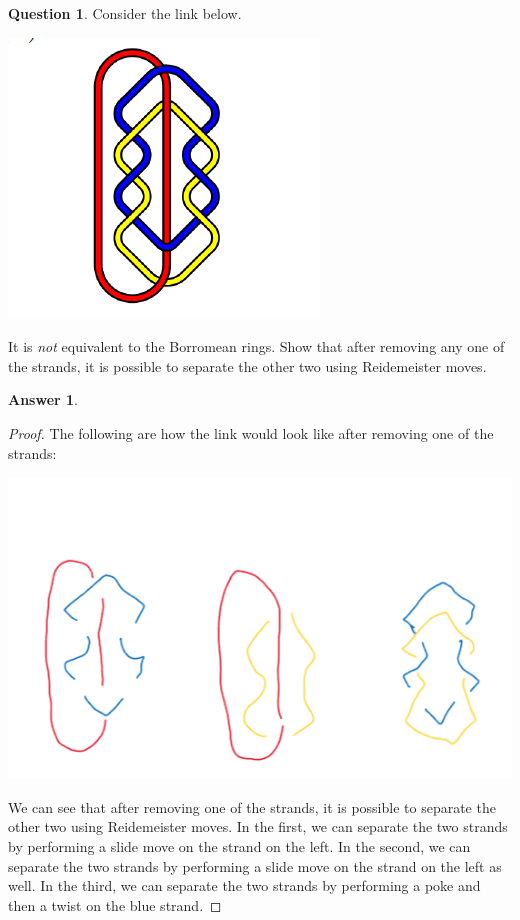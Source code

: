 \documentclass[article, 12pt]{article}
\theoremstyle{definition}
\newtheorem{question}{Question}
\newtheorem{answer}{Answer}
\begin{document}
    \begin{question}
        Consider the link below. 

        \includegraphics[scale=.4]{fullpaper.png}
        
        It is \textit{not} equivalent to the Borromean rings. Show that after removing any one of the strands, it is possible to separate the other two using Reidemeister moves.
    \end{question}

    \begin{answer}
        \begin{proof}
            The following are how the link would look like after removing one of the strands:
            
            \includegraphics[scale=.4]{paperclip_and_shit.png}

            We can see that after removing one of the strands, it is possible to separate the other two using Reidemeister moves. In the first, we can separate the two strands by performing a slide move on the strand on the left. In the second, we can separate the two strands by performing a slide move on the strand on the left as well. In the third, we can separate the two strands by performing a poke and then a twist on the blue strand. 
        \end{proof}
    \end{answer}
\end{document}
